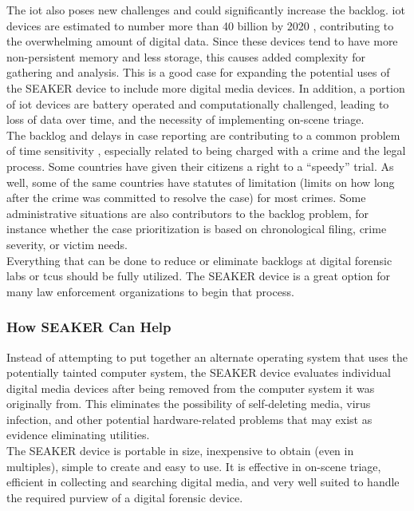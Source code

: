 \documentclass[12pt]{article}
\begin{document}
The \gls{iot} also poses new challenges and could significantly
increase the backlog.  \gls{iot} devices are estimated to number more than 40 billion by
2020 \cite{abi2014iot}, contributing to the overwhelming amount of digital data.  Since these devices
tend to have more non-persistent memory and less storage, this causes added
complexity for gathering and analysis.  This is a good case for expanding the 
potential uses of the SEAKER device to include more digital media devices.
In addition, a portion of \gls{iot} devices are battery operated and computationally
challenged, leading to loss of data over time, and the necessity of implementing
on-scene triage.\\

The backlog and delays in case reporting are contributing to a common problem of
time sensitivity \cite{hitchcock2016tiered}, especially related to being charged
with a crime and the legal process.  Some countries have given their citizens a
right to a ``speedy'' trial.  As well, some of the same countries have statutes
of limitation (limits on how long after the crime was committed to resolve the
case) for most crimes.  Some administrative situations are also contributors to
the backlog problem, for instance whether the case prioritization is based on
chronological filing, crime severity, or victim needs.\\

Everything that can be done to reduce or eliminate backlogs at digital forensic labs
or \glspl{tcu} should be fully utilized.  The SEAKER device is a great option for
many law enforcement organizations to begin that process.\\

\subsubsection{How SEAKER Can Help}

Instead
of attempting to put together an alternate operating system that uses the potentially
tainted computer system, the SEAKER device evaluates individual digital media
devices after being removed from the computer system it was originally from.  This
eliminates the possibility of self-deleting media, virus infection, and other 
potential hardware-related problems that may exist as evidence eliminating utilities.\\

The SEAKER device is portable in size, inexpensive to obtain (even in multiples),
simple to create and easy to use.  It is effective in on-scene triage, efficient in collecting and
searching digital media, and very well suited to handle the required purview of a digital
forensic device.\\
\end{document}
